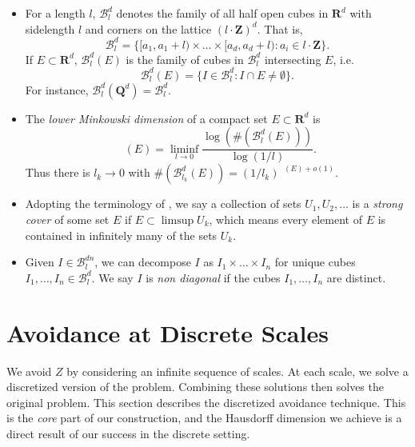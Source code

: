 \documentclass[usenames,dvipsnames]{article}
\theoremstyle{plain}
\theoremstyle{plain}
\DeclareMathOperator{\lhdim}{\underline{\dim}_{\mathbf{M}}}
\DeclareMathOperator{\lmbdim}{\underline{\dim}_{\mathbf{MB}}}
\begin{document}
\begin{itemize}
	\item For a length $l$, $\mathcal{B}^d_l$ denotes the family of all half open cubes in $\mathbf{R}^d$ with sidelength $l$ and corners on the lattice $(l \cdot \mathbf{Z})^d$. That is,
	\[ \mathcal{B}^d_l = \{ [a_1,a_1 + l) \times \dots \times [a_d, a_d + l) : a_i \in l \cdot \mathbf{Z} \}. \]
	If $E \subset \mathbf{R}^d$, $\mathcal{B}^d_l(E)$ is the family of cubes in $\mathcal{B}^d_l$ intersecting $E$, i.e.
	\[\mathcal{B}^d_l(E) = \{ I \in \mathcal{B}^d_l: I \cap E \neq \emptyset \}. \]
	For instance, $\mathcal{B}^d_l(\mathbf{Q}^d) = \mathcal{B}^d_l$.

	\item The {\it lower Minkowski dimension} of a compact set $E \subset \mathbf{R}^d$ is
	\[ \lhdim(E) = \liminf_{l \to 0} \frac{\log( \#( \mathcal{B}^d_l(E) ) )}{\log(1/l)}. \]
	Thus there is $l_k \to 0$ with $\# ( \mathcal{B}^d_{l_k}(E) ) = (1/l_k)^{\lhdim(E) + o(1)}$.


	\item Adopting the terminology of \cite{KatzTao}, we say a collection of sets $U_1, U_2, \dots$ is a {\it strong cover} of some set $E$ if $E \subset \limsup U_k$, which means every element of $E$ is contained in infinitely many of the sets $U_k$.

	\item Given $I \in \mathcal{B}^{dn}_l$, we can decompose $I$ as $I_1 \times \dots \times I_n$ for unique cubes $I_1, \dots, I_n \in \mathcal{B}^d_l$. We say $I$ is {\it non diagonal} if the cubes $I_1, \dots, I_n$ are distinct.
\end{itemize}

\section{Avoidance at Discrete Scales}

We avoid $Z$ by considering an infinite sequence of scales. At each scale, we solve a discretized version of the problem. Combining these solutions then solves the original problem. This section describes the discretized avoidance technique. This is the {\it core} part of our construction, and the Hausdorff dimension we achieve is a direct result of our success in the discrete setting.
\end{document}
